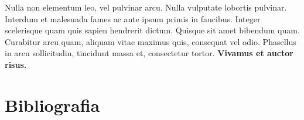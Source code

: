 \documentclass[12pt,a4paper]{article}
\begin{document}
Nulla non elementum leo, vel pulvinar arcu. Nulla vulputate lobortis pulvinar. Interdum et malesuada fames ac ante ipsum primis in faucibus. Integer scelerisque quam quis sapien hendrerit dictum. Quisque sit amet bibendum quam. Curabitur arcu quam, aliquam vitae maximus quis, consequat vel odio. Phasellus in arcu sollicitudin, tincidunt massa et, consectetur tortor. \textbf{Vivamus et auctor risus.}

	
	\section{Bibliografia}
	\printbibliography
	
\end{document}
